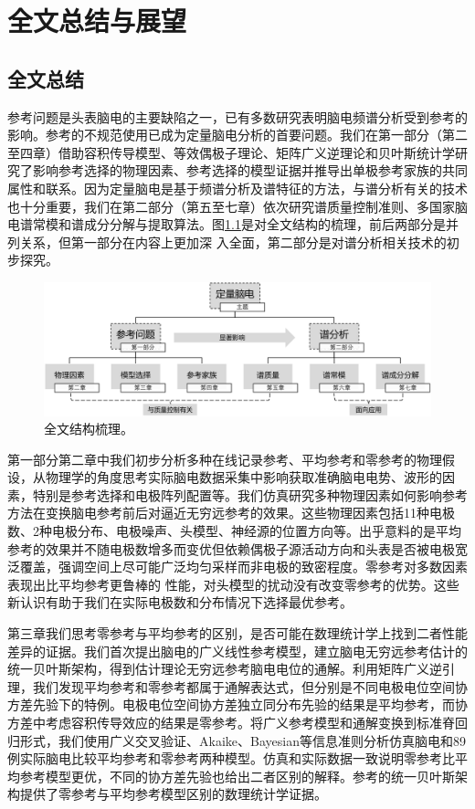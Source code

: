 \chapter{全文总结与展望}
\section{全文总结}
参考问题是头表脑电的主要缺陷之一，已有多数研究表明脑电频谱分析受到参考的影响。参考的不规范使用已成为定量脑电分析的首要问题。我们在第一部分（第二至四章）借助容积传导模型、等效偶极子理论、矩阵广义逆理论和贝叶斯统计学研究了影响参考选择的物理因素、参考选择的模型证据并推导出单极参考家族的共同属性和联系。因为定量脑电是基于频谱分析及谱特征的方法，与谱分析有关的技术也十分重要，我们在第二部分（第五至七章）依次研究谱质量控制准则、多国家脑电谱常模和谱成分分解与提取算法。图\ref{8:sum}是对全文结构的梳理，前后两部分是并列关系，但第一部分在内容上更加深
入全面，第二部分是对谱分析相关技术的初步探究。
\begin{figure}[!h]
\includegraphics[width=\linewidth]{pic/sum/sum.png}
\caption{全文结构梳理。}
\label{8:sum}
\end{figure}

第一部分第二章中我们初步分析多种在线记录参考、平均参考和零参考的物理假设，从物理学的角度思考实际脑电数据采集中影响获取准确脑电电势、波形的因素，特别是参考选择和电极阵列配置等。我们仿真研究多种物理因素如何影响参考方法在变换脑电参考前后对逼近无穷远参考的效果。这些物理因素包括11种电极数、2种电极分布、电极噪声、头模型、神经源的位置方向等。出乎意料的是平均参考的效果并不随电极数增多而变优但依赖偶极子源活动方向和头表是否被电极宽泛覆盖，强调空间上尽可能广泛均匀采样而非电极的致密程度。零参考对多数因素表现出比平均参考更鲁棒的
性能，对头模型的扰动没有改变零参考的优势。这些新认识有助于我们在实际电极数和分布情况下选择最优参考。

第三章我们思考零参考与平均参考的区别，是否可能在数理统计学上找到二者性能差异的证据。我们首次提出脑电的广义线性参考模型，建立脑电无穷远参考估计的统一贝叶斯架构，得到估计理论无穷远参考脑电电位的通解。利用矩阵广义逆引理，我们发现平均参考和零参考都属于通解表达式，但分别是不同电极电位空间协方差先验下的特例。电极电位空间协方差独立同分布先验的结果是平均参考，而协方差中考虑容积传导效应的结果是零参考。将广义参考模型和通解变换到标准脊回归形式，我们使用广义交叉验证、Akaike、Bayesian等信息准则分析仿真脑电和89例实际脑电比较平均参考和零参考两种模型。仿真和实际数据一致说明零参考比平均参考模型更优，不同的协方差先验也给出二者区别的解释。参考的统一贝叶斯架构提供了零参考与平均参考模型区别的数理统计学证据。

